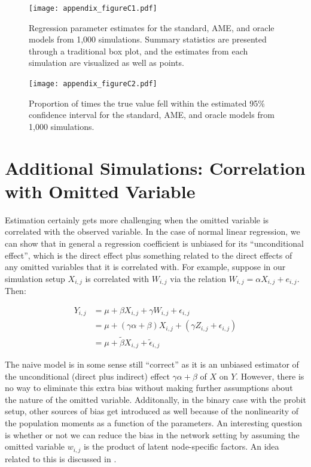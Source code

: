 \documentclass[12pt]{amsart}
\begin{document}
\begin{figure}[ht]
	\centering
	\caption{Regression parameter estimates for the standard, AME, and oracle models from 1,000 simulations. Summary statistics are presented through a traditional box plot, and the estimates from each simulation are visualized as well as points.}
	\label{fig:ameBias_asa}
	\texttt{[image: appendix\_figureC1.pdf]} \\
\end{figure}

\begin{figure}[ht]
	\centering
	\caption{Proportion of times the true value fell within the estimated 95\% confidence interval for the standard, AME, and oracle models from 1,000 simulations.}
	\label{fig:ameCalib_asa}
	\texttt{[image: appendix\_figureC2.pdf]} \\
\end{figure}

\FloatBarrier
\clearpage

\section{Additional Simulations: Correlation with Omitted Variable}

Estimation certainly gets more challenging when the omitted variable is correlated with the observed variable. In the case of normal linear regression, we can show that in general a regression coefficient is unbiased for its ``unconditional effect'', which is the direct effect plus something related to the direct effects of any omitted variables that it is correlated with. For example, suppose in our simulation setup $X_{i,j}$ is correlated with $W_{i,j}$ via the relation $W_{i,j} = \alpha X_{i,j} + e_{i,j}$. Then:

\begin{align*}
  Y_{i,j} & = \mu + \beta X_{i,j} + \gamma W_{i,j} + \epsilon_{i,j} \\
  &= \mu + (\gamma \alpha+\beta ) X_{i,j} + (\gamma Z_{i,j} + \epsilon_{i,j})  \\
  &= \mu + \tilde \beta X_{i,j} + \tilde \epsilon_{i,j}
\end{align*}

The naive model is in some sense still ``correct'' as it is an unbiased estimator of the unconditional (direct plus indirect) effect $\gamma\alpha + \beta$ of $X$ on $Y$. However, there is no way to eliminate this extra bias without making further assumptions about the nature of the omitted variable. Additonally, in the binary case with the probit setup, other sources of bias get introduced as well because of the nonlinearity of the population moments as a function of the parameters. An interesting question is whether or not we can reduce the bias in the network setting by assuming the omitted variable $w_{i,j}$ is the product of latent node-specific factors. An idea related to this is discussed in \citet{minhas:etal:2017:arxiv}.
\end{document}
